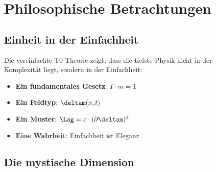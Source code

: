 	\begin{table}[htbp]
		\centering
		\caption{Vergleich von komplexer und einfacher Lagrange-Dichte}
		\label{tab:complexity_comparison}
	\end{table}
	
	\section{Philosophische Betrachtungen}
	
	\subsection{Einheit in der Einfachheit}
	
	\begin{tcolorbox}[colback=green!5!white,colframe=green!75!black,title=Philosophische Erkenntnis]
		Die vereinfachte T0-Theorie zeigt, dass die tiefste Physik nicht in der Komplexität liegt, sondern in der Einfachheit:
		
		\begin{itemize}
			\item \textbf{Ein fundamentales Gesetz}: $T \cdot m = 1$
			\item \textbf{Ein Feldtyp}: $\deltam(x,t)$
			\item \textbf{Ein Muster}: $\Lag = \varepsilon \cdot (\partial \deltam)^2$
			\item \textbf{Eine Wahrheit}: Einfachheit ist Eleganz
		\end{itemize}
	\end{tcolorbox}
	
	\subsection{Die mystische Dimension}
	
